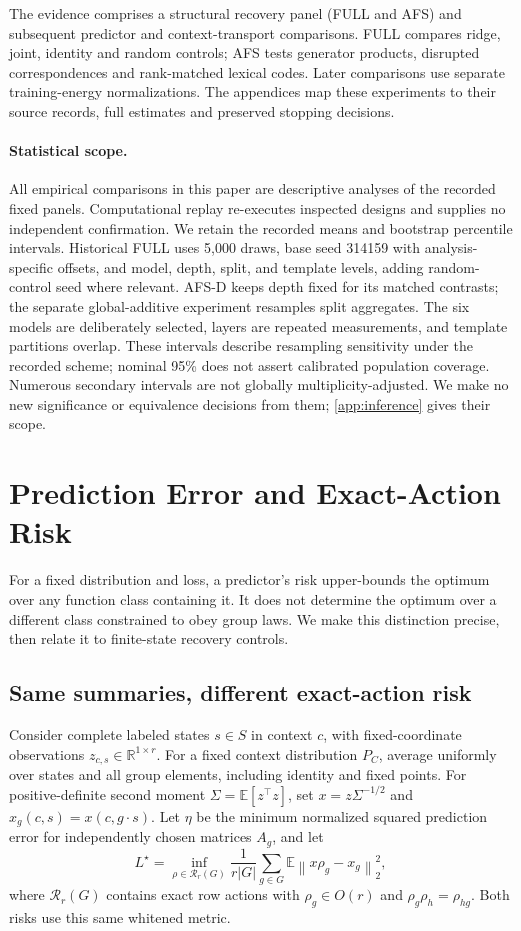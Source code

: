 \documentclass{article}
\newcommand{\R}{\mathbb{R}}
\newcommand{\norm}[1]{\left\lVert #1\right\rVert}
\begin{document}
The evidence comprises a structural recovery panel (FULL and AFS) and subsequent predictor and context-transport comparisons. FULL compares ridge, joint, identity and random controls; AFS tests generator products, disrupted correspondences and rank-matched lexical codes. Later comparisons use separate training-energy normalizations. The appendices map these experiments to their source records, full estimates and preserved stopping decisions.

\paragraph{Statistical scope.}
All empirical comparisons in this paper are descriptive analyses of the recorded fixed panels. Computational replay re-executes inspected designs and supplies no independent confirmation. We retain the recorded means and bootstrap percentile intervals. Historical FULL uses 5,000 draws, base seed 314159 with analysis-specific offsets, and model, depth, split, and template levels, adding random-control seed where relevant. AFS-D keeps depth fixed for its matched contrasts; the separate global-additive experiment resamples split aggregates. The six models are deliberately selected, layers are repeated measurements, and template partitions overlap. These intervals describe resampling sensitivity under the recorded scheme; nominal 95\% does not assert calibrated population coverage. Numerous secondary intervals are not globally multiplicity-adjusted. We make no new significance or equivalence decisions from them; \cref{app:inference} gives their scope.

\section{Prediction Error and Exact-Action Risk}
\label{sec:boundaries}
For a fixed distribution and loss, a predictor's risk upper-bounds the optimum over any function class containing it. It does not determine the optimum over a different class constrained to obey group laws. We make this distinction precise, then relate it to finite-state recovery controls.

\subsection{Same summaries, different exact-action risk}
Consider complete labeled states $s\in S$ in context $c$, with fixed-coordinate observations $z_{c,s}\in\R^{1\times r}$. For a fixed context distribution $P_C$, average uniformly over states and all group elements, including identity and fixed points. For positive-definite second moment $\Sigma=\mathbb E[z^\top z]$, set $x=z\Sigma^{-1/2}$ and $x_g(c,s)=x(c,g\cdot s)$. Let $\eta$ be the minimum normalized squared prediction error for independently chosen matrices $A_g$, and let
\[
 L^\star=\inf_{\rho\in\mathcal R_r(G)}
 \frac1{r|G|}\sum_{g\in G}\mathbb E\norm{x\rho_g-x_g}_2^2,
\]
where $\mathcal R_r(G)$ contains exact row actions with $\rho_g\in O(r)$ and $\rho_g\rho_h=\rho_{hg}$. Both risks use this same whitened metric.
\end{document}
